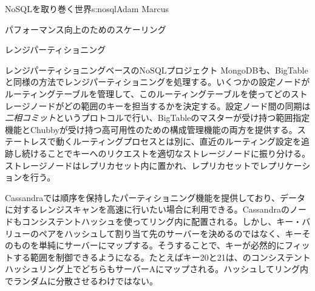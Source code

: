 \begin{aosachapter}{NoSQLを取り巻く世界}{s:nosql}{Adam Marcus}
\begin{aosasect1}{パフォーマンス向上のためのスケーリング}
\begin{aosasect2}{レンジパーティショニング}
\begin{aosasect3}{レンジパーティショニングベースのNoSQLプロジェクト}
MongoDBも、BigTableと同様の方法でレンジパーティショニングを処理する。いくつかの設定ノードがルーティングテーブルを管理して、このルーティングテーブルを使ってどのストレージノードがどの範囲のキーを担当するかを決定する。設定ノード間の同期は\emph{二相コミット}というプロトコルで行い、BigTableのマスターが受け持つ範囲指定機能とChubbyが受け持つ高可用性のための構成管理機能の両方を提供する。ステートレスで動くルーティングプロセスとは別に、直近のルーティング設定を追跡し続けることでキーへのリクエストを適切なストレージノードに振り分ける。ストレージノードはレプリカセット内に置かれ、レプリカセットでレプリケーションを行う。

Cassandraでは順序を保持したパーティショニング機能を提供しており、データに対するレンジスキャンを高速に行いたい場合に利用できる。Cassandraのノードもコンシステントハッシュを使ってリング内に配置される。しかし、キー・バリューのペアをハッシュして割り当て先のサーバーを決めるのではなく、キーそのものを単純にサーバーにマップする。そうすることで、キーが必然的にフィットする範囲を制御できるようになる。たとえばキー20と21は、のコンシステントハッシュリング上でどちらもサーバーAにマップされる。ハッシュしてリング内でランダムに分散させるわけではない。


\end{aosasect3}
\end{aosasect2}
\end{aosasect1}
\end{aosachapter}

